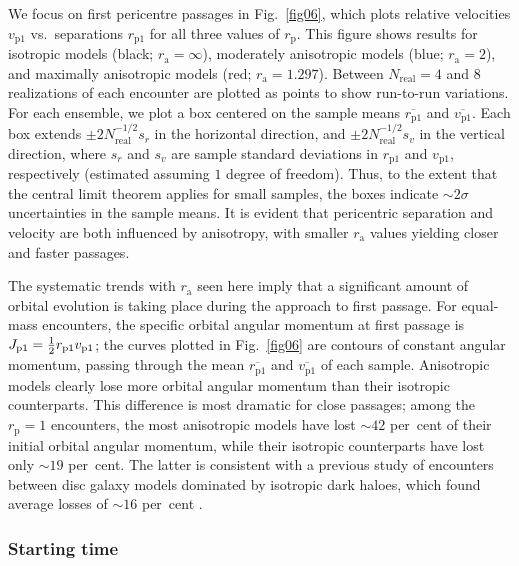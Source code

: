\documentclass[fleqn,usenatbib]{mnras}
\begin{document}
We focus on first pericentre passages in Fig.~\ref{fig06}, which plots relative velocities $v_\mathrm{p1}$ vs.~separations $r_\mathrm{p1}$ for all three values of $r_\mathrm{p}$. This figure shows results for isotropic models (black; $r_\mathrm{a} = \infty$), moderately anisotropic models (blue; $r_\mathrm{a} = 2$), and maximally anisotropic models (red; $r_\mathrm{a} = 1.297$). Between $N_\mathrm{real} = 4$ and $8$ realizations of each encounter are plotted as points to show run-to-run variations. For each ensemble, we plot a box centered on the sample means $\overline{r_\mathrm{p1}}$ and $\overline{v_\mathrm{p1}}$. Each box extends $\pm 2 N_\mathrm{real}^{-1/2} s_{r}$ in the horizontal direction, and $\pm 2 N_\mathrm{real}^{-1/2} s_{v}$ in the vertical direction, where $s_{r}$ and $s_{v}$ are sample standard deviations in $r_\mathrm{p1}$ and $v_\mathrm{p1}$, respectively (estimated assuming $1$ degree of freedom). Thus, to the extent that the central limit theorem applies for small samples, the boxes indicate $\sim 2 \sigma$ uncertainties in the sample means. It is evident that pericentric separation and velocity are both influenced by anisotropy, with smaller $r_\mathrm{a}$ values yielding closer and faster passages.

The systematic trends with $r_\mathrm{a}$ seen here imply that a significant amount of orbital evolution is taking place during the approach to first passage. For equal-mass encounters, the specific orbital angular momentum at first passage is $J_\mathrm{p1} = \textstyle\frac{1}{2} r_\mathrm{p1} v_\mathrm{p1}$; the curves plotted in Fig.~\ref{fig06} are contours of constant angular momentum, passing through the mean $\overline{r_\mathrm{p1}}$ and $\overline{v_\mathrm{p1}}$ of each sample. Anisotropic models clearly lose more orbital angular momentum than their isotropic counterparts. This difference is most dramatic for close passages; among the $r_\mathrm{p} = 1$ encounters, the most anisotropic models have lost $\sim 42$ per~cent of their initial orbital angular momentum, while their isotropic counterparts have lost only $\sim 19$ per~cent. The latter is consistent with a previous study of encounters between disc galaxy models dominated by isotropic dark haloes, which found average losses of $\sim 16$ per~cent \citep{Barnes2016}.

\subsubsection{Starting time}
\label{sec:starting_time}
\end{document}
